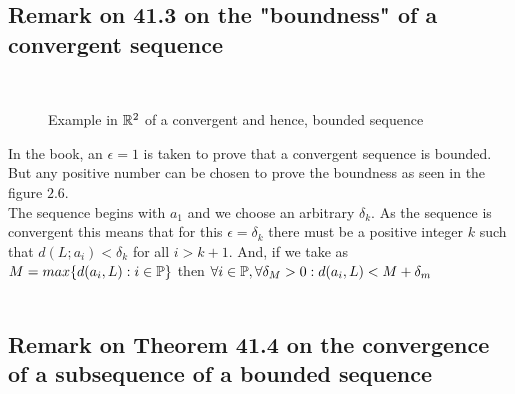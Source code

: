 
\subsection*{Remark on 41.3 on the "boundness" of a convergent sequence}
\begin{figure}[H]%
    \centering
\\
\caption{Example in $\mathbb{R}^2$ of a convergent and hence, bounded sequence}
\label{fig:fig_p8a}
\end{figure}
In the book, an $\epsilon=1$ is taken to prove that a convergent sequence is bounded. But any positive number can be chosen to prove the boundness as seen in the figure $2.6$.\\
The sequence begins with $a_1$ and we choose an arbitrary $\delta_k$. As the sequence is convergent this means that for this $\epsilon= \delta_k$ there must be a positive integer $k$ such that $d(L;a_i)<\delta_k$ for all $i>k+1$. And, if we take as $M=max \{d(a_i,L):i\in \mathbb{P}\}$ then $\forall i\in \mathbb{P}, \forall \delta_M>0: d(a_i,L)< M+\delta_m$
\renewcommand{\thesubsection}{\thesection.\arabic{subsection}}
\setcounter{subsection}{0}
\\\\
\subsection*{Remark on Theorem 41.4 on the convergence of a subsequence of a bounded sequence}

